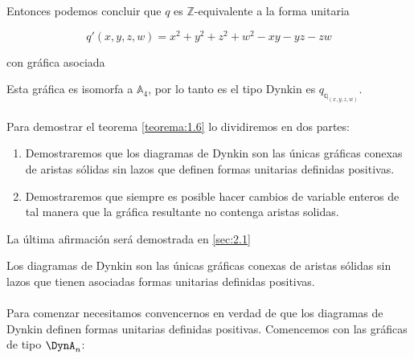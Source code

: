 \begin{example}
Entonces podemos concluir que $q$ es $\mathbb{Z}$-equivalente a la forma unitaria

\begin{equation*}
q'\left(x, y, z, w\right) = x^{2} + y^{2} + z^{2} + w^{2} - xy - yz - zw
\end{equation*}

con gráfica asociada

\begin{center}
\end{center}

Esta gráfica es isomorfa a $\mathbb{A}_{4}$, por lo tanto es el tipo Dynkin es $q_{\mathbb{q}_{(x, y, z, w)}}$.
\end{example}

\paragraph{}
Para demostrar el teorema \ref{teorema:1.6} lo dividiremos en dos partes:

\begin{enumerate}
    \item Demostraremos que los diagramas de Dynkin son las únicas gráficas conexas de aristas sólidas sin lazos que definen formas unitarias definidas positivas.
    \item Demostraremos que siempre es posible hacer cambios de variable enteros de tal manera que la gráfica resultante no contenga aristas solidas.
\end{enumerate}

La última afirmación será demostrada en \ref{sec:2.1}

\begin{lemma}
Los diagramas de Dynkin son las únicas gráficas conexas de aristas sólidas sin lazos que tienen asociadas formas unitarias definidas positivas.
\label{lema:1.7}
\end{lemma}

\paragraph{}
Para comenzar necesitamos convencernos en verdad de que los diagramas de Dynkin definen formas unitarias definidas positivas. Comencemos con las gráficas de tipo $\DynA_{n}$:

